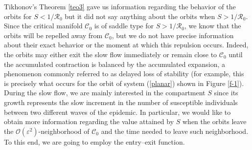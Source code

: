 \documentclass[11pt,reqno]{amsart}
\theoremstyle{boldremark}
\begin{document}
Tikhonov's Theorem \ref{teo3} gave us information regarding the behavior of the orbits for $S<1/\mathcal{R}_0$ but it did not say anything about the orbits when $S>1/\mathcal{R}_0$. Since the critical manifold $\mathcal{C}_0$ is of saddle type for $S>1/\mathcal{R}_0$, we know that the orbits will be repelled away from $\mathcal{C}_0$, but we do not have precise information about their exact behavior or the moment at which this repulsion occurs. Indeed, the orbits may either exit the slow flow immediately or remain close to $\mathcal{C}_0$ until the accumulated contraction is balanced by the accumulated expansion, a phenomenon commonly referred to as delayed loss of stability \cite{15} (for example, this is precisely what occurs for the orbit of system (\ref{planar}) shown in Figure \ref{f-1}). During the slow flow, we are mainly interested in the compartment $S$ since its growth represents the slow increment in the number of susceptible individuals between two different waves of the  epidemic. In particular, we would like to obtain more information regarding the value attained by $S$ when the orbits leave the $\mathcal{O}(\varepsilon^2)$-neighborhood of $\mathcal{C}_0$ and the time needed to leave such neighborhood. To this end, we are going to employ the entry–exit function. 
\end{document}
